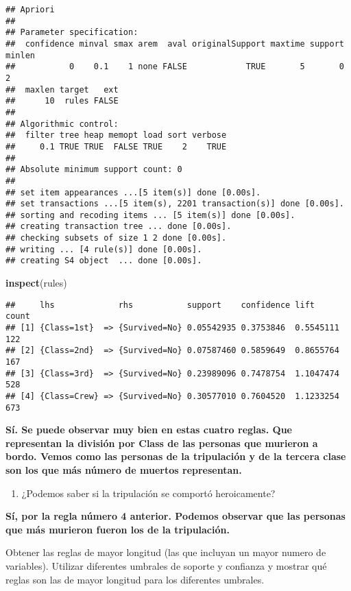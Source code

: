 \documentclass[]{article}
\newenvironment{Shaded}{\begin{snugshade}}{\end{snugshade}}
\newcommand{\KeywordTok}[1]{\textcolor[rgb]{0.13,0.29,0.53}{\textbf{#1}}}
\newcommand{\NormalTok}[1]{#1}
\providecommand{\tightlist}{%
  \setlength{\itemsep}{0pt}\setlength{\parskip}{0pt}}
\begin{document}
\begin{verbatim}
## Apriori
## 
## Parameter specification:
##  confidence minval smax arem  aval originalSupport maxtime support minlen
##           0    0.1    1 none FALSE            TRUE       5       0      2
##  maxlen target   ext
##      10  rules FALSE
## 
## Algorithmic control:
##  filter tree heap memopt load sort verbose
##     0.1 TRUE TRUE  FALSE TRUE    2    TRUE
## 
## Absolute minimum support count: 0 
## 
## set item appearances ...[5 item(s)] done [0.00s].
## set transactions ...[5 item(s), 2201 transaction(s)] done [0.00s].
## sorting and recoding items ... [5 item(s)] done [0.00s].
## creating transaction tree ... done [0.00s].
## checking subsets of size 1 2 done [0.00s].
## writing ... [4 rule(s)] done [0.00s].
## creating S4 object  ... done [0.00s].
\end{verbatim}

\begin{Shaded}
\begin{Highlighting}[]
\KeywordTok{inspect}\NormalTok{(rules)}
\end{Highlighting}
\end{Shaded}

\begin{verbatim}
##     lhs             rhs           support    confidence lift      count
## [1] {Class=1st}  => {Survived=No} 0.05542935 0.3753846  0.5545111 122  
## [2] {Class=2nd}  => {Survived=No} 0.07587460 0.5859649  0.8655764 167  
## [3] {Class=3rd}  => {Survived=No} 0.23989096 0.7478754  1.1047474 528  
## [4] {Class=Crew} => {Survived=No} 0.30577010 0.7604520  1.1233254 673
\end{verbatim}

\textbf{Sí. Se puede observar muy bien en estas cuatro reglas. Que
representan la división por Class de las personas que murieron a bordo.
Vemos como las personas de la tripulación y de la tercera clase son los
que más número de muertos representan.}

\begin{enumerate}
\def\labelenumi{\alph{enumi})}
\setcounter{enumi}{2}
\tightlist
\item
  ¿Podemos saber si la tripulación se comportó heroicamente?
\end{enumerate}

\textbf{Sí, por la regla número 4 anterior. Podemos observar que las
personas que más murieron fueron los de la tripulación.}

Obtener las reglas de mayor longitud (las que incluyan un mayor numero
de variables). Utilizar diferentes umbrales de soporte y confianza y
mostrar qué reglas son las de mayor longitud para los diferentes
umbrales.
\end{document}
